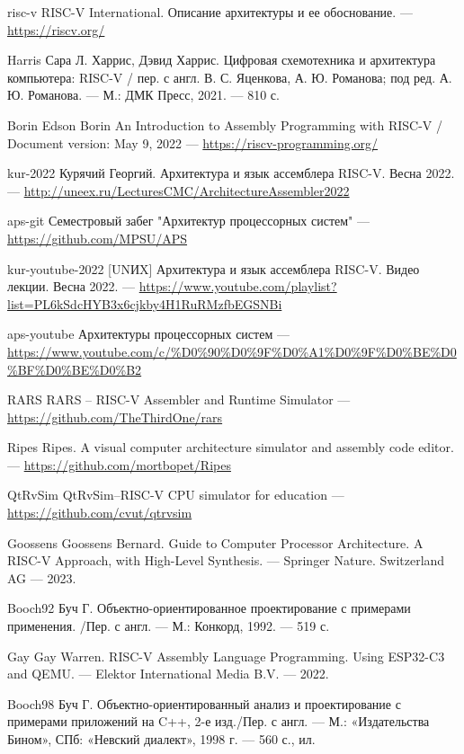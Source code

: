 \begin{thebibliography}{00}

\bibitem
{risc-v}
RISC-V International. Описание архитектуры и ее обоснование.
--- \url{https://riscv.org/}

\bibitem
{Harris}
Сара Л. Харрис, Дэвид Харрис.
Цифровая схемотехника и архитектура компьютера: RISC-V / пер. с англ. В. С. Яценкова, А. Ю. Романова; под ред. А. Ю. Романова. --- М.: ДМК Пресс, 2021. --- 810 с.

\bibitem
{Borin}
Edson Borin
An Introduction to Assembly Programming with RISC-V /
Document version: May 9, 2022
--- \url{https://riscv-programming.org/}


\bibitem
{kur-2022}
Курячий Георгий. Архитектура и язык ассемблера RISC-V. Весна 2022.
--- \url{http://uneex.ru/LecturesCMC/ArchitectureAssembler2022}

\bibitem
{aps-git}
Семестровый забег "Архитектур процессорных систем"
--- \url{https://github.com/MPSU/APS}

\bibitem
{kur-youtube-2022}
[UNИX] Архитектура и язык ассемблера RISC-V. Видео лекции. Весна 2022.
--- \url{https://www.youtube.com/playlist?list=PL6kSdcHYB3x6cjkby4H1RuRMzfbEGSNBi}

\bibitem
{aps-youtube}
Архитектуры процессорных систем
--- \url{https://www.youtube.com/c/%D0%90%D0%9F%D0%A1%D0%9F%D0%BE%D0%BF%D0%BE%D0%B2}

\bibitem
{RARS}
RARS -- RISC-V Assembler and Runtime Simulator
--- \url{https://github.com/TheThirdOne/rars}

\bibitem
{Ripes}
Ripes. A visual computer architecture simulator and assembly code editor.
--- \url{https://github.com/mortbopet/Ripes}

\bibitem
{QtRvSim}
QtRvSim–RISC-V CPU simulator for education
--- \url{https://github.com/cvut/qtrvsim}

\bibitem
{Goossens}
Goossens Bernard.
Guide to Computer Processor Architecture. A RISC-V Approach, with High-Level Synthesis.
--- Springer Nature. Switzerland AG --- 2023.

\bibitem
{Booch92}
Буч Г.
Объектно-ориентированное проектирование с примерами применения. /Пер. с англ.
--- М.: Конкорд, 1992. --- 519 с.

\bibitem
{Gay}
Gay Warren.
RISC-V Assembly Language Programming. Using ESP32-C3 and QEMU.
--- Elektor International Media B.V. --- 2022.

\bibitem
{Booch98}
Буч Г.
Объектно-ориентированный анализ и проектирование с примерами приложений на C++, 2-е изд./Пер. с англ.
--- М.: «Издательства Бином», СПб: «Невский диалект», 1998 г. --- 560 с., ил.


\end{thebibliography}
